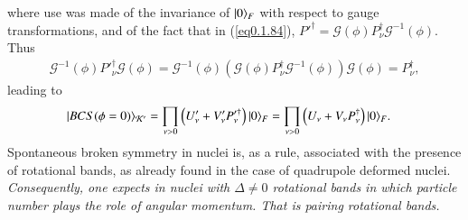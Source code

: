 where use was made of the invariance of $|{0} \rangle_F$ with respect to gauge transformations, and of the fact that in (\ref{eq0.1.84}), $P'^\dagger=\mathcal G(\phi)P^\dagger_\nu\mathcal G^{-1}(\phi)$. Thus 
\begin{align}\label{eq0.1.89}
\mathcal G^{-1}(\phi)P'^\dagger_\nu\mathcal G(\phi)=\mathcal G^{-1}(\phi)\left(\mathcal G(\phi)P^\dagger_\nu\mathcal G^{-1}(\phi)\right)\mathcal G(\phi)=P^\dagger_\nu,
\end{align}
leading to
\begin{align}\label{eq0.1.90}
|{BCS(\phi=0)} \rangle_{\mathcal K'}&=\prod_{\nu>0}\left(U'_\nu+V'_\nu P'^\dagger_\nu\right)|{0} \rangle_F=\prod_{\nu>0}\left(U_\nu+V_\nu P^\dagger_\nu\right)|{0} \rangle_F.
\end{align}
Spontaneous broken symmetry in nuclei is, as a rule, associated with the presence of rotational bands, as already found in the case of quadrupole deformed nuclei. \textit{Consequently, one expects in nuclei with $\Delta\neq0$ rotational bands in which particle number plays the role of angular momentum. That is pairing rotational bands. }

